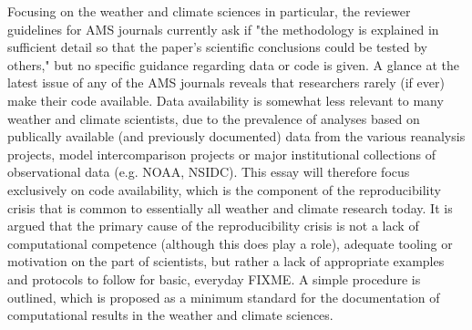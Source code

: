 Focusing on the weather and climate sciences in particular, the reviewer guidelines for AMS journals currently ask if "the methodology is explained in sufficient detail so that the paper's scientific conclusions could be tested by others," but no specific guidance regarding data or code is given. A glance at the latest issue of any of the AMS journals reveals that researchers rarely (if ever) make their code available. Data availability is somewhat less relevant to many weather and climate scientists, due to the prevalence of analyses based on publically available (and previously documented) data from the various reanalysis projects, model intercomparison projects or major institutional collections of observational data (e.g. NOAA, NSIDC). This essay will therefore  focus exclusively on code availability, which is the component of the reproducibility crisis that is common to essentially all weather and climate research today. It is argued that the primary cause of the reproducibility crisis is not a lack of computational competence (although this does play a role), adequate tooling or motivation on the part of scientists, but rather a lack of appropriate examples and protocols to follow for basic, everyday FIXME. A simple procedure is outlined, which is proposed as a minimum standard for the documentation of computational results in the weather and climate sciences.



